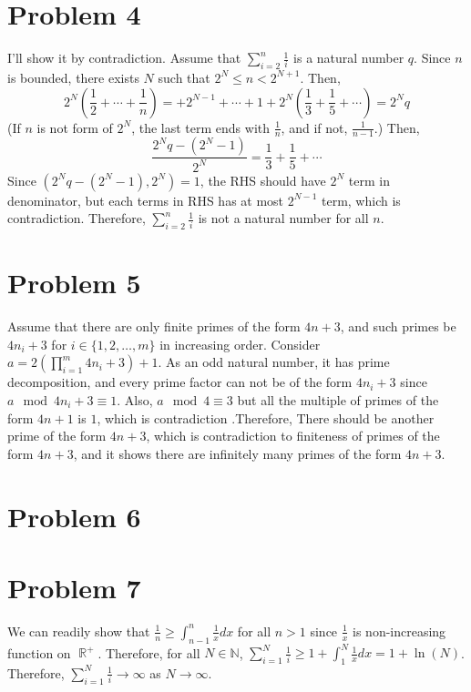 \documentclass{article}
\DeclareMathOperator{\rr}{\mathbb{R}}
\begin{document}
\section*{Problem 4}
I'll show it by contradiction. Assume that $\sum\limits_{i=2}^n \frac{1}{i}$ is a natural number $q$. Since $n$ is bounded, there exists $N$ such that $2^N\leq n < 2^{N+1}$. Then,
\begin{equation*}
2^N\left(\frac{1}{2}+\cdots +\frac{1}{n}\right)=+2^{N-1}+\cdots+1+2^N\left(\frac{1}{3}+\frac{1}{5}+\cdots\right)=2^N q
\end{equation*}
(If $n$ is not form of $2^N$, the last term ends with $\frac{1}{n}$, and if not, $\frac{1}{n-1}$.)
Then,
\begin{equation*}
\frac{2^N q-(2^{N}-1)}{2^N}=\frac{1}{3}+\frac{1}{5}+\cdots
\end{equation*}
Since $(2^N q-(2^{N}-1), 2^N)=1$, the RHS should have $2^N$ term in denominator, but each terms in RHS has at most $2^{N-1}$ term, which is contradiction. Therefore, $\sum\limits_{i=2}^n \frac{1}{i}$ is not a natural number for all $n$.
\section*{Problem 5}
Assume that there are only finite primes of the form $4n+3$, and such primes be $4n_i+3$ for $i\in \{1, 2, \ldots, m\}$ in increasing order. Consider $a=2\left(\prod_{i=1}^m 4n_i+3\right)+1$. As an odd natural number, it has prime decomposition, and every prime factor can not be of the form $4n_i+3$ since $a \mod 4n_i+3\equiv 1$. Also, $a \mod 4\equiv 3$ but all the multiple of primes of the form $4n+1$ is $1$, which is contradiction .Therefore, There should be another prime of the form $4n+3$, which is contradiction to finiteness of primes of the form $4n+3$, and it shows there are infinitely many primes of the form $4n+3$.
\section*{Problem 6}

\section*{Problem 7}
We can readily show that $\frac{1}{n}\geq \int_{n-1}^{n} \frac{1}{x} dx$ for all $n>1$ since $\frac{1}{x}$ is non-increasing function on $\rr^+$. Therefore, for all $N\in \mathbb{N}$, $\sum\limits_{i=1}^N \frac{1}{i}\geq 1+\int_1^{N}\frac{1}{x} dx=1+\ln(N)$. Therefore, $\sum\limits_{i=1}^N \frac{1}{i}\rightarrow \infty$ as $N\rightarrow \infty$.
\end{document}
